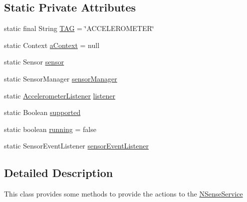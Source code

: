 \subsection*{Static Private Attributes}
\begin{DoxyCompactItemize}
\item 
static final String \hyperlink{classcs_1_1nsense_1_1accelerometer_1_1_acceler_sen_manager_ad669f18249fb29b582aa9c4850feb496}{T\-A\-G} = \char`\"{}A\-C\-C\-E\-L\-E\-R\-O\-M\-E\-T\-E\-R\char`\"{}
\item 
static Context \hyperlink{classcs_1_1nsense_1_1accelerometer_1_1_acceler_sen_manager_ab69ade607ca050ba47e3ef89a316606a}{a\-Context} = null
\item 
static Sensor \hyperlink{classcs_1_1nsense_1_1accelerometer_1_1_acceler_sen_manager_a5f78f1b0c5d973a82f6c26d3980cbf96}{sensor}
\item 
static Sensor\-Manager \hyperlink{classcs_1_1nsense_1_1accelerometer_1_1_acceler_sen_manager_a7a38912fd6f45a8d2ae42711505a1191}{sensor\-Manager}
\item 
static \hyperlink{interfacecs_1_1nsense_1_1accelerometer_1_1_accelerometer_listener}{Accelerometer\-Listener} \hyperlink{classcs_1_1nsense_1_1accelerometer_1_1_acceler_sen_manager_a5ffa2f553d7ceb1ff3f0d14d55498aee}{listener}
\item 
static Boolean \hyperlink{classcs_1_1nsense_1_1accelerometer_1_1_acceler_sen_manager_a9c170f7b3bb6edb7f36540f22e815229}{supported}
\item 
static boolean \hyperlink{classcs_1_1nsense_1_1accelerometer_1_1_acceler_sen_manager_a6f293390a67a02d2c126a71e162349b4}{running} = false
\item 
static Sensor\-Event\-Listener \hyperlink{classcs_1_1nsense_1_1accelerometer_1_1_acceler_sen_manager_a2af5da27f9dc2f2ed4bf2ba1f55f1a77}{sensor\-Event\-Listener}
\end{DoxyCompactItemize}


\subsection{Detailed Description}
This class provides some methods to provide the actions to the \hyperlink{classcs_1_1nsense_1_1_n_sense_service}{N\-Sense\-Service} 

